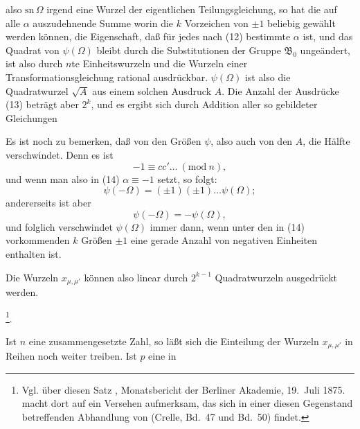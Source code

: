 
also $\mathrm{sn}\,\Omega$ irgend eine Wurzel der eigentlichen Teilungsgleichung, so
hat die auf alle $\alpha$ auszudehnende Summe
worin die $k$ Vorzeichen von $\pm 1$ beliebig gewählt werden können, die Eigenschaft,
daß für jedes nach (12) bestimmte $\alpha$
ist, und das Quadrat von $\psi(\Omega)$ bleibt durch die Substitutionen der Gruppe
$\mathfrak{B}_0$ ungeändert, ist also durch $n$te Einheitswurzeln und die Wurzeln
einer Transformationsgleichung rational ausdrückbar. $\psi(\Omega)$ ist also die
Quadratwurzel $\sqrt{A}$ aus einem solchen Ausdruck $A$. Die Anzahl der Ausdrücke (13)
beträgt aber $2^k$, und es ergibt sich durch Addition aller so gebildeter Gleichungen

Es ist noch zu bemerken, daß von den Größen $\psi$, also auch von den $A$, die Hälfte
verschwindet. Denn es ist
\[
-1 \equiv cc' \ldots \ (\mathrm{mod}\ n),
\]
und wenn man also in (14) $\alpha \equiv -1$ setzt, so folgt:
\[
\psi(-\Omega) = (\pm 1)(\pm 1)\ldots\psi(\Omega);
\]
andererseits ist aber
\[
\psi(-\Omega) = -\psi(\Omega),
\]
und folglich verschwindet $\psi(\Omega)$ immer dann, wenn unter den in (14)
vorkommenden $k$ Größen $\pm 1$ eine gerade Anzahl von negativen Einheiten enthalten
ist.

Die Wurzeln $x_{\mu,\mu'}$ können also linear durch $2^{k-1}$ Quadratwurzeln
ausgedrückt werden.

\footnote{Vgl. über diesen Satz , Monatsbericht der Berliner
Akademie, 19.\ Juli 1875.  macht dort auf ein Versehen aufmerksam, das sich
in einer diesen Gegenstand betreffenden Abhandlung von  (Crelle, Bd.\ 47 und
Bd.\ 50) findet.}.

Ist $n$ eine zusammengesetzte Zahl, so läßt sich die Einteilung der Wurzeln
$x_{\mu,\mu'}$ in Reihen noch weiter treiben. Ist $p$ eine in
